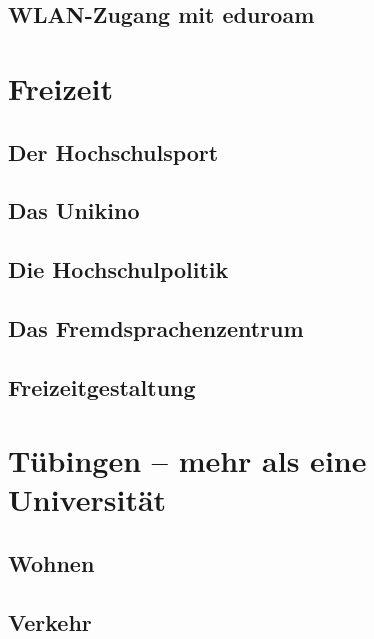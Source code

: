 \documentclass[12pt, a4paper]{article}
\begin{document}
\subsection{WLAN-Zugang mit eduroam}



\section{Freizeit}

\subsection{Der Hochschulsport}


\subsection{Das Unikino}


\subsection{Die Hochschulpolitik}



\subsection{Das Fremdsprachenzentrum}


\newpage
\subsection{Freizeitgestaltung}



\pagebreak

\section{Tübingen -- mehr als eine Universität}
\subsection{Wohnen}


\subsection{Verkehr}

\end{document}
